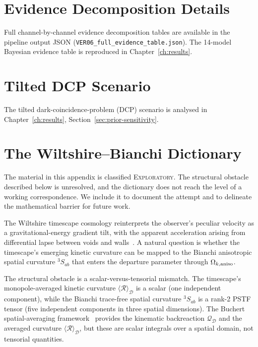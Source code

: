 \chapter{Evidence Decomposition Details}
\label{app:evidence-full}

Full channel-by-channel evidence decomposition tables are
available in the pipeline output JSON
(\texttt{VER06\_full\_evidence\_table.json}).
The 14-model Bayesian evidence table is reproduced in
Chapter~\ref{ch:results}.


\chapter{Tilted DCP Scenario}
\label{app:DCP}

The tilted dark-coincidence-problem (DCP) scenario is
analysed in Chapter~\ref{ch:results},
Section~\ref{sec:prior-sensitivity}.


\chapter{The Wiltshire--Bianchi Dictionary}
\label{app:wiltshire}

\begin{remark}
\label{rem:wiltshire-quarantine}
The material in this appendix is classified
\textsc{Exploratory}.  The structural obstacle described
below is unresolved, and the dictionary does not reach
the level of a working correspondence.  We include it to
document the attempt and to delineate the mathematical
barrier for future work.
\end{remark}

The Wiltshire timescape cosmology reinterprets the
observer's peculiar velocity as a gravitational-energy
gradient tilt, with the apparent acceleration arising from
differential lapse between voids and
walls~\cite{Wiltshire2007,Wiltshire2009}.  A natural
question is whether the timescape's emerging kinetic
curvature can be mapped to the Bianchi anisotropic spatial
curvature ${}^3\!S_{ab}$ that enters the departure
parameter through $\Omega_{k,\mathrm{aniso}}$.

The structural obstacle is a scalar-versus-tensorial
mismatch.  The timescape's monopole-averaged kinetic
curvature $\langle \mathcal{R} \rangle_{\mathcal{D}}$ is
a scalar (one independent component), while the Bianchi
trace-free spatial curvature ${}^3\!S_{ab}$ is a rank-2
PSTF tensor (five independent components in three spatial
dimensions).  The Buchert spatial-averaging
framework~\cite{BuchertMourierRoy2020} provides the
kinematic backreaction $\mathcal{Q}_{\mathcal{D}}$ and the
averaged curvature
$\langle \mathcal{R} \rangle_{\mathcal{D}}$, but these are
scalar integrals over a spatial domain, not tensorial
quantities.

